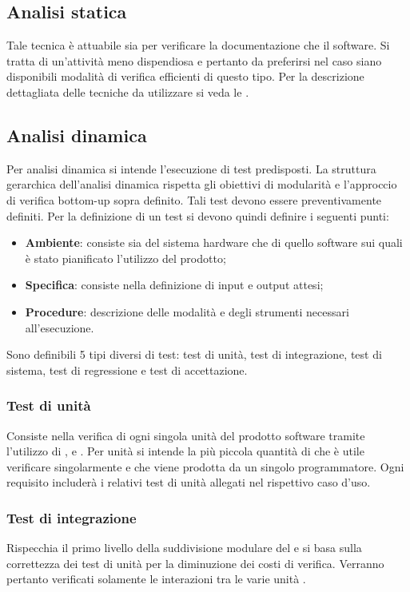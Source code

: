 \documentclass[12pt,a4paper]{article}
\begin{document}
\subsection{Analisi statica}
Tale tecnica è attuabile sia per verificare la documentazione che il software. Si tratta di un'attività meno dispendiosa e pertanto da preferirsi nel caso siano disponibili modalità di verifica efficienti di questo tipo. Per la descrizione dettagliata delle tecniche da utilizzare si veda le \NdP.

\subsection{Analisi dinamica}
Per analisi dinamica si intende l'esecuzione di test predisposti. La struttura gerarchica dell'analisi dinamica rispetta gli obiettivi di modularità e l'approccio di verifica bottom-up sopra definito. Tali test devono essere preventivamente definiti.
Per la definizione di un test si devono quindi definire i seguenti punti:
\begin{itemize}
	\item \textbf{Ambiente}: consiste sia del sistema hardware che di quello software sui quali è stato pianificato l’utilizzo del prodotto;
	\item \textbf{Specifica}: consiste nella definizione di input e output attesi;
	\item \textbf{Procedure}: descrizione delle modalità e degli strumenti necessari all'esecuzione.
\end{itemize}
Sono definibili 5 tipi diversi di test: test di unità, test di integrazione, test di sistema, test di regressione e test di accettazione.

\subsubsection{Test di unità}
Consiste nella verifica di ogni singola unità del prodotto software tramite l’utilizzo di ,  e .
Per unità si intende la più piccola quantità di  che è utile verificare singolarmente e che viene prodotta da un singolo programmatore.
Ogni requisito includerà i relativi test di unità allegati nel rispettivo caso d'uso.

\subsubsection{Test di integrazione}
Rispecchia il primo livello della suddivisione modulare del  e si basa sulla correttezza dei test di unità per la diminuzione dei costi di verifica. Verranno pertanto verificati solamente le interazioni tra le varie unità .
\end{document}
